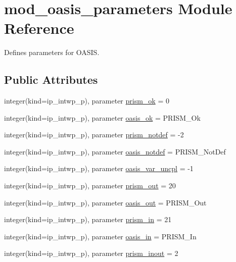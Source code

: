 \hypertarget{classmod__oasis__parameters}{\section{mod\+\_\+oasis\+\_\+parameters Module Reference}
\label{classmod__oasis__parameters}
}


Defines parameters for O\+A\+S\+I\+S.  


\subsection*{Public Attributes}
\begin{DoxyCompactItemize}
\item 
integer(kind=ip\+\_\+intwp\+\_\+p), parameter \hyperlink{classmod__oasis__parameters_aa7cbeb1a099f571702827ace878cdc64}{prism\+\_\+ok} = 0
\item 
integer(kind=ip\+\_\+intwp\+\_\+p), parameter \hyperlink{classmod__oasis__parameters_a3ea125963822918ce37fd3cfd9658c9f}{oasis\+\_\+ok} = P\+R\+I\+S\+M\+\_\+\+Ok
\item 
integer(kind=ip\+\_\+intwp\+\_\+p), parameter \hyperlink{classmod__oasis__parameters_aa388f517f0a947f770637d617bdda79b}{prism\+\_\+notdef} = -\/2
\item 
integer(kind=ip\+\_\+intwp\+\_\+p), parameter \hyperlink{classmod__oasis__parameters_acbe396fd3b5e7b00dd66425f0acb546d}{oasis\+\_\+notdef} = P\+R\+I\+S\+M\+\_\+\+Not\+Def
\item 
integer(kind=ip\+\_\+intwp\+\_\+p), parameter \hyperlink{classmod__oasis__parameters_ac906e1466e6cdc300a0b582af6619ca5}{oasis\+\_\+var\+\_\+uncpl} = -\/1
\item 
integer(kind=ip\+\_\+intwp\+\_\+p), parameter \hyperlink{classmod__oasis__parameters_a58d4e90d13e758e6a6dfab01e6a1415e}{prism\+\_\+out} = 20
\item 
integer(kind=ip\+\_\+intwp\+\_\+p), parameter \hyperlink{classmod__oasis__parameters_a76a150fa8ef6ed0b35183e627d757439}{oasis\+\_\+out} = P\+R\+I\+S\+M\+\_\+\+Out
\item 
integer(kind=ip\+\_\+intwp\+\_\+p), parameter \hyperlink{classmod__oasis__parameters_a9cd491b86da0ba4612f2de5a9ef52e7c}{prism\+\_\+in} = 21
\item 
integer(kind=ip\+\_\+intwp\+\_\+p), parameter \hyperlink{classmod__oasis__parameters_a16809ad581bb609aa5b0661927478653}{oasis\+\_\+in} = P\+R\+I\+S\+M\+\_\+\+In
\item 
integer(kind=ip\+\_\+intwp\+\_\+p), parameter \hyperlink{classmod__oasis__parameters_ae8105d0074bcd93e7da5c40331d2b9fe}{prism\+\_\+inout} = 2

\end{DoxyCompactItemize}
